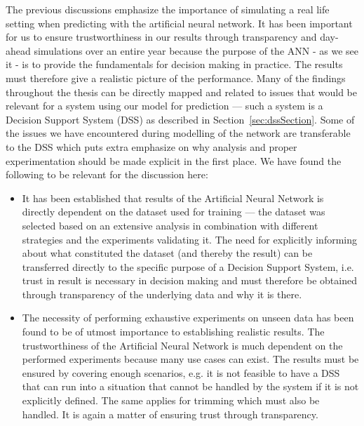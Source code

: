 The previous discussions emphasize the importance of simulating a real life setting when predicting with the artificial neural network. It has been important for us to ensure trustworthiness in our results through transparency and day-ahead simulations over an entire year because the purpose of the ANN - as we see it - is to provide the fundamentals for decision making in practice. The results must therefore give a realistic picture of the performance. Many of the findings throughout the thesis can be directly mapped and related to issues that would be relevant for a system using our model for prediction --- such a system is a Decision Support System (DSS) as described in Section~\ref{sec:dssSection}. Some of the issues we have encountered during modelling of the network are transferable to the DSS which puts extra emphasize on why analysis and proper experimentation should be made explicit in the first place. We have found the following to be relevant for the discussion here:

\begin{itemize}
\item It has been established that results of the Artificial Neural Network is directly dependent on the dataset used for training --- the dataset was selected based on an extensive analysis in combination with different strategies and the experiments validating it. The need for explicitly informing about what constituted the dataset (and thereby the result) can be transferred directly to the specific purpose of a Decision Support System, i.e. trust in result is necessary in decision making and must therefore be obtained through transparency of the underlying data and why it is there. 
\item The necessity of performing exhaustive experiments on unseen data has been found to be of utmost importance to establishing realistic results. The trustworthiness of the Artificial Neural Network is much dependent on the performed experiments because many use cases can exist. The results must be ensured by covering enough scenarios, e.g. it is not feasible to have a DSS that can run into a situation that cannot be handled by the system if it is not explicitly defined. The same applies for trimming which must also be handled. It is again a matter of ensuring trust through transparency.
\end{itemize}

